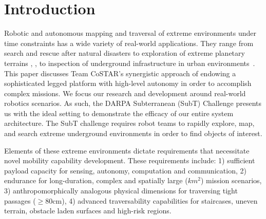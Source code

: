\documentclass[letterpaper, 10pt, conference]{ieeeconf}      %
\newcommand{\rev}[1]{{\color{blue} #1 }} %
\begin{document}



\section{Introduction}\label{sec:intro}
\rev{Robotic and autonomous mapping and traversal of extreme environments under time constraints has a wide variety of real-world applications. 
They range from search and rescue after natural disasters \cite{Nagatani2013} to exploration of extreme planetary terrains \rev{\cite{ali-agu}, \cite{Taka2020JFR}, \cite{Husain2013}}to inspection of underground infrastructure in urban environments~\cite{Kolvenbach2020}.
This paper discusses Team CoSTAR's synergistic approach of endowing a sophisticated legged platform with high-level autonomy in order to accomplish complex missions. We focus our research and development around real-world robotics scenarios. 
As such, the DARPA Subterranean (SubT) Challenge \cite{subt_webpage} presents us with the ideal setting to demonstrate the efficacy of our entire system architecture. 
The SubT challenge requires robot teams to rapidly explore, map, and search extreme underground environments in order to find objects of interest.

Elements of these extreme environments dictate requirements that necessitate novel mobility capability development. These requirements include:
1) sufficient payload capacity for sensing, autonomy, computation and communication, 2) endurance for long-duration, complex and spatially large (\texttildelow $km^2$) mission scenarios, 3) anthropomorphically analogous physical dimensions for traversing tight passages ($\geq$80cm), 4) advanced traversability capabilities for staircases, uneven terrain, obstacle laden surfaces and high-risk regions.}
\end{document}
